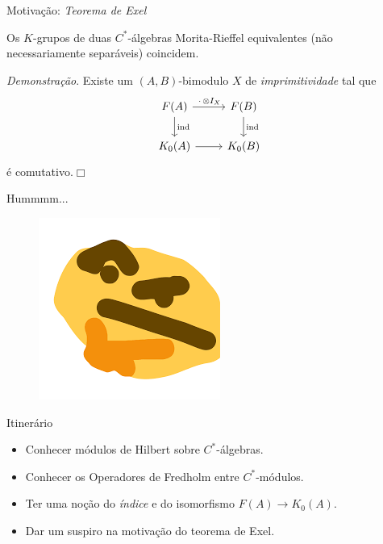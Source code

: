 \documentclass[handout, 9pt, compress]{beamer}
\begin{document}
{\begin{frame}[fragile]{Motivação: \textit{Teorema de Exel}}
    \begin{teorema}[Exel (1992)]
        Os $K$-grupos de duas $C^*$-álgebras Morita-Rieffel equivalentes (não necessariamente separáveis) coincidem.
    \end{teorema}

    \textit{Demonstração}. \pause 
    Existe um $(A,B)$-bimodulo $X$ de \textit{imprimitividade} tal que \pause
    $$
    \begin{tikzcd}
    F(A) \rar{\,\cdot\, \otimes I_X} \dar{\operatorname{ind}} & F(B) \dar{\operatorname{ind}} \\
    K_0(A) \rar{}                                             & K_0(B)                              
    \end{tikzcd}
    $$
    é comutativo.\hfill $\Box$
\end{frame}

\begin{frame}{Hummmm...}
    \begin{figure}[h]
        \includegraphics[width=0.45\linewidth]{hummm.png}
    \end{figure}
\end{frame}

\begin{frame}{Itinerário}
    \begin{itemize}
        \item Conhecer módulos de Hilbert sobre $C^*$-álgebras.\pause
        \item Conhecer os Operadores de Fredholm entre $C^*$-módulos.\pause
        \item Ter uma noção do \textit{índice} e do isomorfismo $F(A)\longrightarrow K_0(A)$. \pause
        \item Dar um suspiro na motivação do teorema de Exel.
    \end{itemize}
\end{frame}

}
\end{document}
